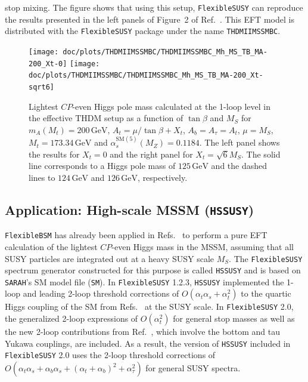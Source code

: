 \documentclass[final,3p,11pt,pdflatex]{elsarticle}
\makeatletter
\newcommand{\modelname}[1]{\texttt{#1}\@\xspace}
\newcommand{\sarah}{\texttt{SARAH}\@\xspace}
\newcommand{\fs}{\texttt{FlexibleSUSY}\@\xspace}
\newcommand{\HSSUSY}{\modelname{HSSUSY}}
\newcommand{\fstwo}{\fs 2.0\@\xspace}
\newcommand{\fbsm}{\texttt{FlexibleBSM}\@\xspace}
\newcommand{\unit}[1]{\,\text{#1}}      %
\newcommand{\SM}{\ensuremath{\text{SM}}\xspace}
\newcommand{\THDM}{\ensuremath{\text{THDM}}\xspace}
\newcommand{\MS}{\ensuremath{M_S}\xspace}
\newcommand{\CP}{\ensuremath{CP}\xspace}
\def\at{\alpha_t}
\def\ab{\alpha_b}
\def\as{\alpha_s}
\def\atau{\alpha_{\tau}}
\makeatother
\begin{document}
stop mixing.  The figure shows that using this setup, \fs can reproduce
the results presented in the left panels of Figure~2 of
Ref.~\cite{Lee:2015uza}.  This EFT model is
distributed with the \fs package under the name \modelname{THDMIIMSSMBC}.
%
\begin{figure}[tbh]
  \centering
  \texttt{[image: doc/plots/THDMIIMSSMBC/THDMIIMSSMBC\_Mh\_MS\_TB\_MA-200\_Xt-0]}\hfill
  \texttt{[image: doc/plots/THDMIIMSSMBC/THDMIIMSSMBC\_Mh\_MS\_TB\_MA-200\_Xt-sqrt6]}
  \caption{Lightest \CP-even Higgs pole mass calculated at the 1-loop
    level in the effective \THDM setup as a function of $\tan\beta$ and
    $\MS$ for $m_A(M_t) = 200\unit{GeV}$, $A_t = \mu/\tan\beta +
    X_t$, $A_b = A_\tau = A_t$, $\mu = \MS$, $M_t = 173.34\unit{GeV}$
    and $\as^{\SM(5)}(M_Z) = 0.1184$.  The left panel shows the results for $X_t
    = 0$ and the right panel for $X_t = \sqrt{6}\MS$.  The solid line
    corresponds to a Higgs pole mass of $125\unit{GeV}$ and the dashed
    lines to $124\unit{GeV}$ and $126\unit{GeV}$, respectively.}
  \label{fig:THDMIIMSSMBC_Mh_MS}
\end{figure}

\subsection{Application: High-scale MSSM (\HSSUSY)}
\label{sec:application_HSSUSY}

\fbsm has already been applied in
Refs.~\cite{Bagnaschi:2015pwa,Athron:2016fuq,Bagnaschi:2017xid} to perform a
pure EFT calculation of the lightest \CP-even Higgs mass in the MSSM,
assuming that all SUSY particles are integrated out at a heavy SUSY
scale $\MS$.  The \fs spectrum generator constructed for this purpose
is called \HSSUSY and is based on \sarah's SM model file
(\modelname{SM}).  In \fs 1.2.3, \HSSUSY implemented the 1-loop and leading
2-loop threshold corrections of $O(\at\as + \at^2)$ to the quartic Higgs
coupling of the SM from
Refs.~\cite{Bagnaschi:2014rsa,Vega:2015fna} at the SUSY scale.  In
\fstwo, the generalized 2-loop expressions of $O(\at^2)$ for general stop
masses as well as the new 2-loop contributions from Ref.~\cite{Bagnaschi:2017xid},
which involve the bottom and tau Yukawa couplings, are
included.  As a result, the version of \HSSUSY included in \fstwo uses
the 2-loop threshold corrections of
$O(\at\as + \ab\as + (\at+\ab)^2 + \atau^2)$ for general SUSY spectra.
\end{document}
